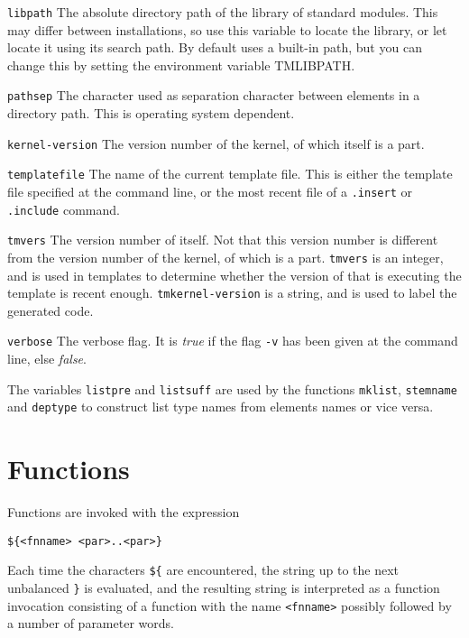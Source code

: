 \begin{desctab}
\item[\texttt{libpath}]
The absolute directory path of the library of standard modules.
This may differ between installations,
so use this variable to locate the library, or let {\Tm} locate
it using its search path.
By default {\Tm} uses a built-in path, but you can change this by setting
the environment variable TMLIBPATH.

\item[\texttt{pathsep}]
The character used as separation character between elements in a directory
path. This is operating system dependent.

\item[\texttt{kernel-version}]
The version number of the {\Tm} kernel, of which {\Tm} itself is a part.

\item[\texttt{templatefile}]
The name of the current template file. This is either the template file
specified at the command line, or the most recent file of a \texttt{.insert}
or \texttt{.include} command.

\item[\texttt{tmvers}]
The version number of {\Tm} itself.
Not that this version number is different from the version number of the
kernel, of which {\Tm} is a part.
\texttt{tmvers} is an integer, and is used in templates to determine whether
the version of {\Tm} that is executing the template is recent enough.
\texttt{tmkernel-version} is a string, and is used to label the generated
code.

\item[\texttt{verbose}]
The verbose flag.  It is \textit{true} if the flag \texttt{-v} has
been given at the command line, else \textit{false}.  \end{desctab}

The variables \texttt{listpre} and \texttt{listsuff} are used by the functions
\verb+mklist+, \verb+stemname+ and \verb+deptype+ to construct list type
names from elements names or vice versa.

\section{Functions}
\label{s.fn}
Functions are invoked with the expression
\begin{showfile}
\begin{verbatim}
${<fnname> <par>..<par>}
\end{verbatim}
\end{showfile}
Each time the characters \texttt{\$\{} are encountered,
the string up to the next unbalanced \texttt{\}} is evaluated,
and the resulting string is
interpreted as a function invocation consisting of a function with the name
\texttt{<fnname>} possibly followed by a number of parameter words.

